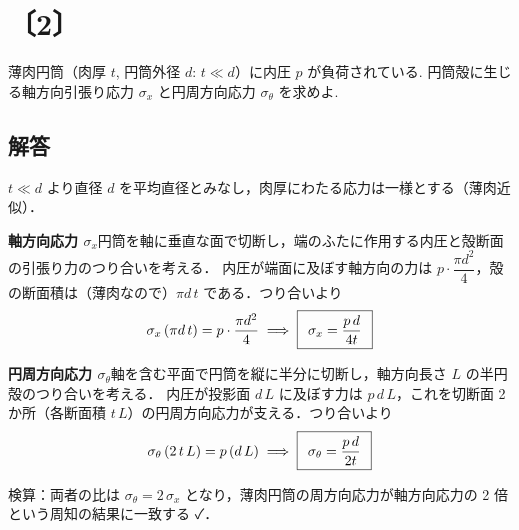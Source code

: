 \documentclass[11pt,a4paper]{article}
\begin{document}
\clearpage
\section*{〔2〕}

薄肉円筒（肉厚 $t$, 円筒外径 $d$: $t\ll d$）に内圧 $p$ が負荷されている.
円筒殻に生じる軸方向引張り応力 $\sigma_x$ と円周方向応力 $\sigma_\theta$ を求めよ.

\begin{center}
\end{center}

\subsection*{解答}

\noindent$t\ll d$ より直径 $d$ を平均直径とみなし，肉厚にわたる応力は一様とする（薄肉近似）．

\medskip
\noindent\textbf{軸方向応力 $\sigma_x$}\quad 円筒を軸に垂直な面で切断し，端のふたに作用する内圧と殻断面の引張り力のつり合いを考える．
内圧が端面に及ぼす軸方向の力は $p\cdot\dfrac{\pi d^2}{4}$，殻の断面積は（薄肉なので）$\pi d\,t$ である．つり合いより
\[
  \sigma_x\,(\pi d\,t)=p\cdot\frac{\pi d^2}{4}
  \;\Longrightarrow\;
  \boxed{\,\;\sigma_x=\frac{p\,d}{4t}\;\,}
\]

\medskip
\noindent\textbf{円周方向応力 $\sigma_\theta$}\quad 軸を含む平面で円筒を縦に半分に切断し，軸方向長さ $L$ の半円殻のつり合いを考える．
内圧が投影面 $d\,L$ に及ぼす力は $p\,d\,L$，これを切断面 2 か所（各断面積 $t\,L$）の円周方向応力が支える．つり合いより
\[
  \sigma_\theta\,(2\,t\,L)=p\,(d\,L)
  \;\Longrightarrow\;
  \boxed{\,\;\sigma_\theta=\frac{p\,d}{2t}\;\,}
\]

\medskip
検算：両者の比は $\sigma_\theta=2\,\sigma_x$ となり，薄肉円筒の周方向応力が軸方向応力の 2 倍という周知の結果に一致する ✓．
\end{document}
